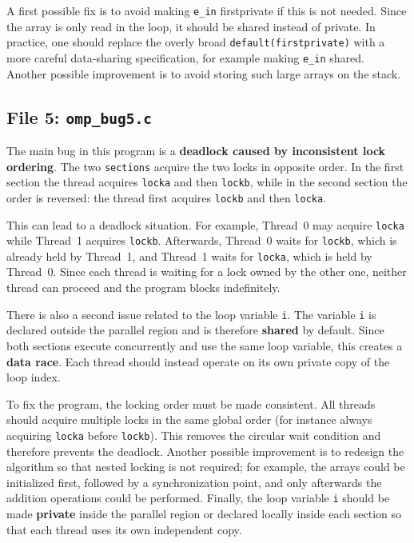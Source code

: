 \documentclass[unicode,10pt,a4paper,oneside,numbers=endperiod,openany]{scrartcl}
\begin{document}
A first possible fix is to avoid making \texttt{e\_in} firstprivate if this is not needed. Since the array is only read in the loop, it should be shared instead of private. In practice, one should replace the overly broad \texttt{default(firstprivate)} with a more careful data-sharing specification, for example making \texttt{e\_in} shared.\\

Another possible improvement is to avoid storing such large arrays on the stack.

\subsection{File 5: \texttt{omp\_bug5.c}}

The main bug in this program is a \textbf{deadlock caused by inconsistent lock ordering}.  
The two \texttt{sections} acquire the two locks in opposite order. In the first section the thread acquires \texttt{locka} and then \texttt{lockb}, while in the second section the order is reversed: the thread first acquires \texttt{lockb} and then \texttt{locka}.

This can lead to a deadlock situation. For example, Thread~0 may acquire \texttt{locka} while Thread~1 acquires \texttt{lockb}. Afterwards, Thread~0 waits for \texttt{lockb}, which is already held by Thread~1, and Thread~1 waits for \texttt{locka}, which is held by Thread~0. Since each thread is waiting for a lock owned by the other one, neither thread can proceed and the program blocks indefinitely.

There is also a second issue related to the loop variable \texttt{i}. The variable \texttt{i} is declared outside the parallel region and is therefore \textbf{shared} by default. Since both sections execute concurrently and use the same loop variable, this creates a \textbf{data race}. Each thread should instead operate on its own private copy of the loop index.

To fix the program, the locking order must be made consistent. All threads should acquire multiple locks in the same global order (for instance always acquiring \texttt{locka} before \texttt{lockb}). This removes the circular wait condition and therefore prevents the deadlock. Another possible improvement is to redesign the algorithm so that nested locking is not required; for example, the arrays could be initialized first, followed by a synchronization point, and only afterwards the addition operations could be performed. Finally, the loop variable \texttt{i} should be made \textbf{private} inside the parallel region or declared locally inside each section so that each thread uses its own independent copy.
\newpage
\end{document}
